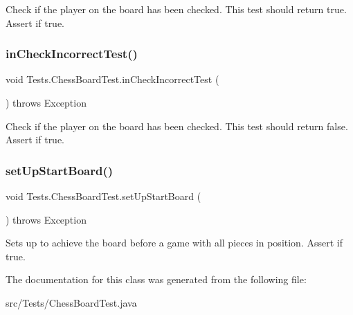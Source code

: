Check if the player on the board has been checked. This test should return true. Assert if true. \mbox{\label{class_tests_1_1_chess_board_test_aa253138d0dce44a1e1fb1cf42ef925d1}} 
\subsubsection{\texorpdfstring{in\+Check\+Incorrect\+Test()}{inCheckIncorrectTest()}}
{\footnotesize\ttfamily void Tests.\+Chess\+Board\+Test.\+in\+Check\+Incorrect\+Test (\begin{DoxyParamCaption}{ }\end{DoxyParamCaption}) throws Exception\hspace{0.3cm}{\ttfamily [inline]}}

Check if the player on the board has been checked. This test should return false. Assert if true. \mbox{\label{class_tests_1_1_chess_board_test_a7a18a9e735b522810010395d66c8dfb6}} 
\subsubsection{\texorpdfstring{set\+Up\+Start\+Board()}{setUpStartBoard()}}
{\footnotesize\ttfamily void Tests.\+Chess\+Board\+Test.\+set\+Up\+Start\+Board (\begin{DoxyParamCaption}{ }\end{DoxyParamCaption}) throws Exception\hspace{0.3cm}{\ttfamily [inline]}}

Sets up to achieve the board before a game with all pieces in position. Assert if true. 

The documentation for this class was generated from the following file\+:\begin{DoxyCompactItemize}
\item 
src/\+Tests/Chess\+Board\+Test.\+java\end{DoxyCompactItemize}
